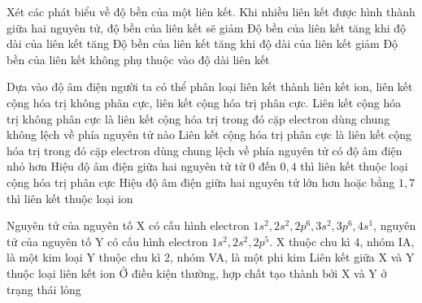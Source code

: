 \begin{ex}
	Xét các phát biểu về độ bền của một liên kết.
	\choiceTF
	{Khi nhiều liên kết được hình thành giữa hai nguyên tử, độ bền của liên kết sẽ giảm}
	{Độ bền của liên kết tăng khi độ dài của liên kết tăng}
	{\True Độ bền của liên kết tăng khi độ dài của liên kết giảm}
	{Độ bền của liên kết không phụ thuộc vào độ dài liên kết}
\end{ex}
\begin{ex}
	Dựa vào độ âm điện người ta có thể phân loại liên kết thành liên kết ion, liên kết cộng hóa trị không phân cực, liên kết cộng hóa trị phân cực.
	\choiceTF
	{\True Liên kết cộng hóa trị không phân cực là liên kết cộng hóa trị trong đó cặp electron dùng chung không lệch về phía nguyên tử nào}
	{Liên kết cộng hóa trị phân cực là liên kết cộng hóa trị trong đó cặp electron dùng chung lệch về phía nguyên tử có độ âm điện nhỏ hơn}
	{Hiệu độ âm điện giữa hai nguyên tử từ $0$ đến $0,4$ thì liên kết thuộc loại cộng hóa trị phân cực}
	{\True Hiệu độ âm điện giữa hai nguyên tử lớn hơn hoặc bằng $1,7$ thì liên kết thuộc loại ion}
\end{ex}
\begin{ex}
	Nguyên tử của nguyên tố X có cấu hình electron $1s^2,2s^2,2p^6,3s^2,3p^6,4s^1$, nguyên tử của nguyên tố Y có cấu hình electron $1s^2,2s^2,2p^5$.
	\choiceTF
	{\True X thuộc chu kì 4, nhóm IA, là một kim loại}
	{Y thuộc chu kì 2, nhóm VA, là một phi kim}
	{\True Liên kết giữa X và Y thuộc loại liên kết ion}
	{Ở điều kiện thường, hợp chất tạo thành bởi X và Y ở trạng thái lỏng}
\end{ex}
